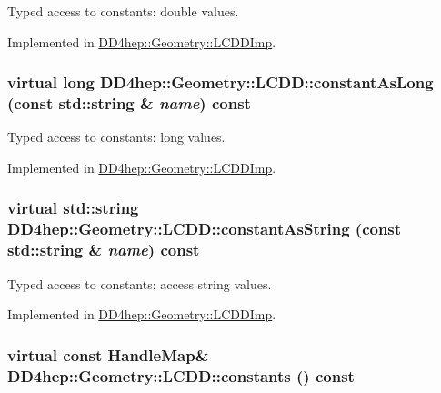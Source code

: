 Typed access to constants: double values. 

Implemented in \hyperlink{class_d_d4hep_1_1_geometry_1_1_l_c_d_d_imp_a5d935f74487075d2297b2ae2884471b2}{DD4hep::Geometry::LCDDImp}.\hypertarget{class_d_d4hep_1_1_geometry_1_1_l_c_d_d_a95370880f4063064af089b943b0e4ce2}{
\subsubsection[{constantAsLong}]{\setlength{\rightskip}{0pt plus 5cm}virtual long DD4hep::Geometry::LCDD::constantAsLong (const std::string \& {\em name}) const}}
\label{class_d_d4hep_1_1_geometry_1_1_l_c_d_d_a95370880f4063064af089b943b0e4ce2}


Typed access to constants: long values. 

Implemented in \hyperlink{class_d_d4hep_1_1_geometry_1_1_l_c_d_d_imp_a02ab7c49c65ba0c8c8df216b280ece39}{DD4hep::Geometry::LCDDImp}.\hypertarget{class_d_d4hep_1_1_geometry_1_1_l_c_d_d_a6857611520c86f1d242a1698ab5c181f}{
\subsubsection[{constantAsString}]{\setlength{\rightskip}{0pt plus 5cm}virtual std::string DD4hep::Geometry::LCDD::constantAsString (const std::string \& {\em name}) const}}
\label{class_d_d4hep_1_1_geometry_1_1_l_c_d_d_a6857611520c86f1d242a1698ab5c181f}


Typed access to constants: access string values. 

Implemented in \hyperlink{class_d_d4hep_1_1_geometry_1_1_l_c_d_d_imp_a4f7a333b0a12119a8a5d64591b38a298}{DD4hep::Geometry::LCDDImp}.\hypertarget{class_d_d4hep_1_1_geometry_1_1_l_c_d_d_a14d6ac1a5de3cd514372ab8717b6420e}{
\subsubsection[{constants}]{\setlength{\rightskip}{0pt plus 5cm}virtual const {\bf HandleMap}\& DD4hep::Geometry::LCDD::constants () const}}
\label{class_d_d4hep_1_1_geometry_1_1_l_c_d_d_a14d6ac1a5de3cd514372ab8717b6420e}


